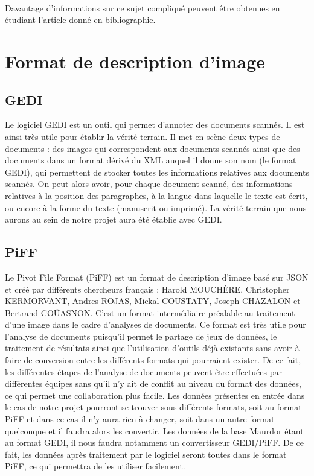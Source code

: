 \paragraph{}
Davantage d'informations sur ce sujet compliqué peuvent être obtenues en étudiant l'article\cite{cdbn:2009} donné en bibliographie.

\section{Format de description d'image}

\subsection{GEDI}

Le logiciel GEDI est un outil qui permet d'annoter des documents scannés. Il est ainsi très utile pour établir
la vérité terrain. Il met en scène deux types de documents : des images qui correspondent aux documents
scannés ainsi que des documents dans un format dérivé du XML auquel il donne son nom (le format GEDI), qui
permettent de stocker toutes les informations relatives aux documents scannés. On peut alors avoir, pour
chaque document scanné, des informations relatives à la position des paragraphes, à la langue dans laquelle
le texte est écrit, ou encore à la forme du texte (manuscrit ou imprimé). La vérité terrain que nous aurons
au sein de notre projet aura été établie avec GEDI.

\subsection{PiFF}

Le Pivot File Format (PiFF) est un format de description d'image basé sur JSON et créé par différents
chercheurs français : Harold MOUCHÈRE, Christopher KERMORVANT, Andres ROJAS, Mickal COUSTATY, Joseph CHAZALON
et Bertrand COÜASNON. C'est un format intermédiaire préalable au traitement d'une image dans le cadre
d'analyses de documents. Ce format est très utile pour l'analyse de documents puisqu'il permet le partage
de jeux de données, le traitement de résultats ainsi que l'utilisation d'outils déjà existants sans avoir à
faire de conversion entre les différents formats qui pourraient exister. De ce fait, les différentes étapes de
l'analyse de documents peuvent être effectuées par différentes équipes sans qu'il n'y ait de conflit au niveau
du format des données, ce qui permet une collaboration plus facile. Les données présentes en entrée dans le cas
de notre projet pourront se trouver sous différents formats, soit au format PiFF et dans ce cas il n'y aura rien
à changer, soit dans un autre format quelconque et il faudra alors les convertir. Les données de la base Maurdor
étant au format GEDI, il nous faudra notamment un convertisseur GEDI/PiFF. De ce fait, les données après traitement
par le logiciel seront toutes dans le format PiFF, ce qui permettra de les utiliser facilement.

